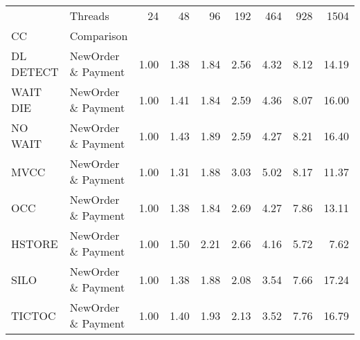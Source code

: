 \begin{tabular}{llrrrrrrr}
\toprule
       & Threads &  24   &  48   &  96   &  192  &  464  &  928  &  1504 \\
CC & Comparison &       &       &       &       &       &       &       \\
\midrule
DL DETECT & NewOrder \& Payment &  1.00 &  1.38 &  1.84 &  2.56 &  4.32 &  8.12 & 14.19 \\
WAIT DIE & NewOrder \& Payment &  1.00 &  1.41 &  1.84 &  2.59 &  4.36 &  8.07 & 16.00 \\
NO WAIT & NewOrder \& Payment &  1.00 &  1.43 &  1.89 &  2.59 &  4.27 &  8.21 & 16.40 \\
MVCC & NewOrder \& Payment &  1.00 &  1.31 &  1.88 &  3.03 &  5.02 &  8.17 & 11.37 \\
OCC & NewOrder \& Payment &  1.00 &  1.38 &  1.84 &  2.69 &  4.27 &  7.86 & 13.11 \\
HSTORE & NewOrder \& Payment &  1.00 &  1.50 &  2.21 &  2.66 &  4.16 &  5.72 &  7.62 \\
SILO & NewOrder \& Payment &  1.00 &  1.38 &  1.88 &  2.08 &  3.54 &  7.66 & 17.24 \\
TICTOC & NewOrder \& Payment &  1.00 &  1.40 &  1.93 &  2.13 &  3.52 &  7.76 & 16.79 \\
\bottomrule
\end{tabular}
